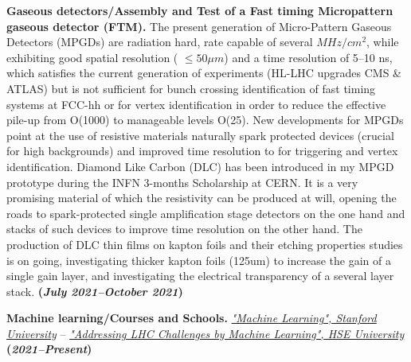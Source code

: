 \documentclass[11pt]{res}
\begin{document}
\begin{resume}
\textbf{Gaseous detectors/Assembly and Test of a Fast timing Micropattern gaseous detector (FTM).} 
The present generation of Micro-Pattern Gaseous Detectors (MPGDs) are radiation hard, rate capable of several $MHz/cm^{2}$, while exhibiting good spatial resolution ( $\le 50\mu m$) and a time resolution of 5–10 ns, which satisfies the current generation of experiments (HL-LHC upgrades CMS \& ATLAS) but is not sufficient for bunch crossing identification of fast timing systems at FCC-hh or for vertex identification in order to reduce the effective pile-up from O(1000) to manageable levels O(25). New developments for MPGDs point at the use of resistive materials naturally spark protected devices (crucial for high backgrounds) and improved time resolution to for triggering and vertex identification. Diamond Like Carbon (DLC) has been introduced in my MPGD prototype during the INFN 3-months Scholarship at CERN. It is a very promising material of which the resistivity can be produced at will, opening the roads to spark-protected single amplification stage detectors on the one hand and stacks of such devices to improve time resolution on the other hand. The production of DLC thin films on kapton foils and their etching properties studies is on going, investigating thicker kapton foils (125um) to increase the gain of a single gain layer, and investigating the electrical transparency of a several layer stack. \textbf{(\textit{July 2021--October 2021})}

\textbf{Machine learning/Courses and Schools.}
\href{https://www.coursera.org/account/accomplishments/verify/DRRN6452E8WB?utm_product=course}{\textit{"Machine Learning", Stanford University}} -- \href{https://www.coursera.org/account/accomplishments/certificate/MY4HQAEAYL9D}{\textit{"Addressing LHC Challenges by Machine Learning",  HSE University}} \textbf{(\textit{2021--Present})}


\end{resume}
\end{document}
